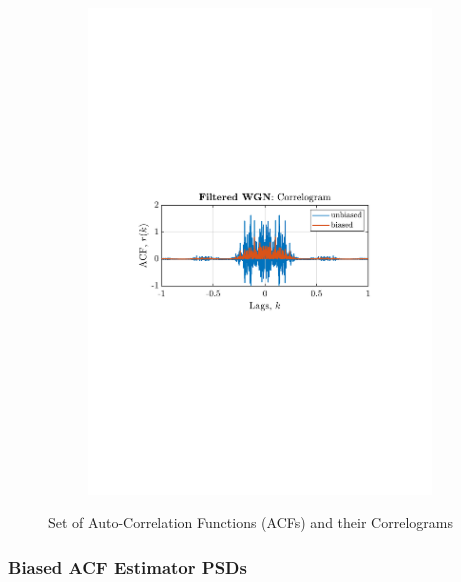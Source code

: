 \documentclass[12pt]{article}
\begin{document}
\begin{figure}[H]
\begin{subfigure}{0.49\textwidth}
			\includegraphics[trim={2.2cm 11.2cm 3.15cm  11.2cm}, clip, width=\textwidth]{../MATLAB/figures/q1_3a_fig06.pdf} 
		\end{subfigure}
		\captionsetup{justification=centering}
		\caption{Set of Auto-Correlation Functions (ACFs) and their Correlograms}
		\label{fig: 1-3a}
	\end{figure}

	\subsubsection{Biased ACF Estimator PSDs}
\end{document}
